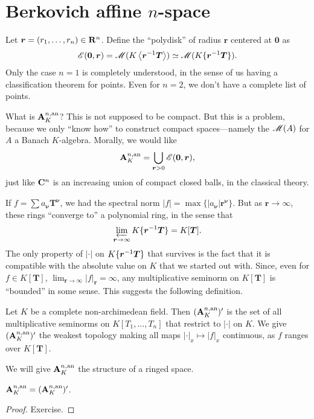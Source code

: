 \section{Berkovich affine \texorpdfstring{$n$}{n}-space}

Let $\bm r=(r_1,\dots,r_n)\in \mathbf{R}^n$. Define the ``polydisk'' of radius $\bm r$ 
centered at $\bm 0$ as 
\[
	\mathscr{E}(\bm 0,\bm r) = \operatorname{\mathscr{M}}(K\left\langle \bm r^{-1} \bm T \right\rangle)\simeq \operatorname{\mathscr{M}}(K\{ \bm r^{-1} \bm T \}) .
\]
Only the case $n=1$ is completely understood, in the sense of us having a 
classification theorem for points. Even for $n=2$, we don't have a complete 
list of points. 

What is $\mathbf{A}_K^{n,\mathrm{an}}$? This is not supposed to be compact. But this is a 
problem, because we only ``know how'' to construct compact spaces---namely the 
$\operatorname{\mathscr{M}}(A)$ for $A$ a Banach $K$-algebra. Morally, we would like 
\[
	\mathbf{A}_K^{n,\mathrm{an}} = \bigcup_{\bm r>0} \mathscr{E}(\bm 0,\bm r) ,
\]
just like $\mathbf{C}^n$ is an increasing union of compact closed balls, in the 
classical theory. 

If $f=\sum a_{\bm \nu} \bm T^{\bm \nu}$, we had the spectral norm 
$|f| = \max\{|a_{\bm\nu}|\bm r^{\bm\nu}\}$. But as $\bm r\to \infty$, these 
rings ``converge to'' a polynomial ring, in the sense that 
\[
	\varprojlim_{\bm r\to \infty} K\{ \bm r^{-1} \bm T \} = K[\bm T] .
\]
The only property of $|\cdot|$ on $K\{ \bm r^{-1} \bm T \}$ that survives is 
the fact that it is compatible with the absolute value on $K$ that we started 
out with. Since, even for $f\in K[\bm T]$, 
$\lim_{\bm r\to \infty} |f|_{\bm r}=\infty$, any multiplicative seminorm on 
$K[\bm T]$ is ``bounded'' in some sense. This suggests the following 
definition. 

\begin{definition}
Let $K$ be a complete non-archimedean field. Then $(\mathbf{A}_K^{n,\mathrm{an}})'$ is the set 
of all multiplicative seminorms on $K[T_1,\dots,T_n]$ that restrict to 
$|\cdot|$ on $K$. We give $(\mathbf{A}_K^{n,\mathrm{an}})'$ the weakest topology making all 
maps $|\cdot|_x\mapsto |f|_x$ continuous, as $f$ ranges over $K[\bm T]$. 
\end{definition}

We will give $\mathbf{A}_K^{n,\mathrm{an}}$ the structure of a ringed space. 

\begin{theorem}
$\mathbf{A}_K^{n,\mathrm{an}} = (\mathbf{A}_K^{n,\mathrm{an}})'$. 
\end{theorem}
\begin{proof}
Exercise. 
\end{proof}

